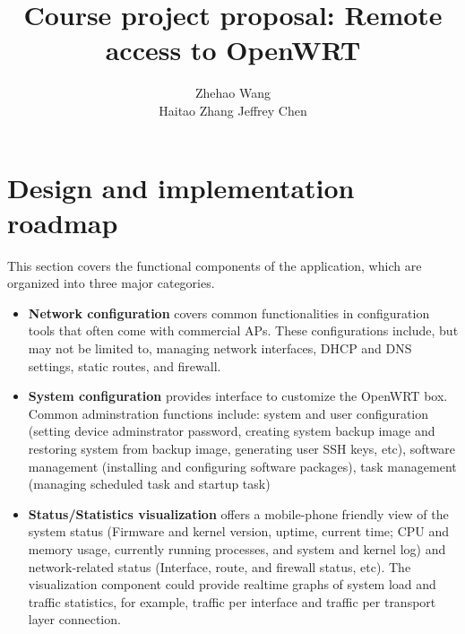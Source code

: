 \documentclass{sig-alternate-05-2015}
\begin{document}
\title{Course project proposal: Remote access to OpenWRT}


\author{
\alignauthor
Zhehao Wang \\
\alignauthor
Haitao Zhang
\alignauthor 
Jeffrey Chen
}

\maketitle

\section{Design and implementation roadmap}

This section covers the functional components of the application, which are organized into three major categories.

\begin{itemize}

\item
\textbf{Network configuration} covers common functionalities in configuration tools that often come with commercial APs. These configurations include, but may not be limited to, managing network interfaces, DHCP and DNS settings, static routes, and firewall.

\item
\textbf{System configuration} provides interface to customize the OpenWRT box. Common adminstration functions include: system and user configuration (setting device adminstrator password, creating system backup image and restoring system from backup image, generating user SSH keys, etc), software management (installing and configuring software packages), task management (managing scheduled task and startup task)

\item
\textbf{Status/Statistics visualization} offers a mobile-phone friendly view of the system status (Firmware and kernel version, uptime, current time; CPU and memory usage, currently running processes, and system and kernel log) and network-related status (Interface, route, and firewall status, etc). The visualization component could provide realtime graphs of system load and traffic statistics, for example, traffic per interface and traffic per transport layer connection.

\end{itemize}
\end{document}
